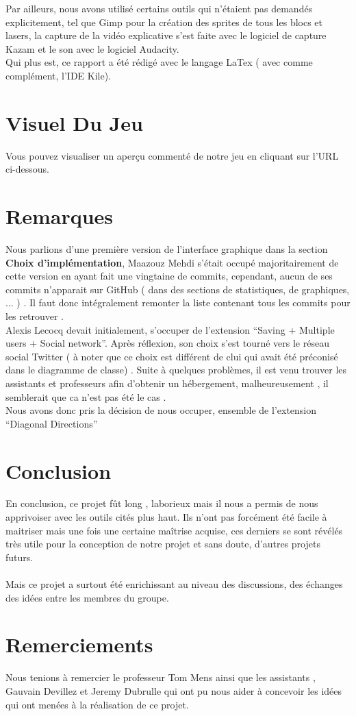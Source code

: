 \documentclass[a4paper,10pt]{article}
\begin{document}
Par ailleurs, nous avons utilisé certains outils qui n'étaient pas demandés explicitement, tel que Gimp pour la création des sprites de tous les blocs et lasers,
la capture de la vidéo explicative s'est faite avec le logiciel de capture Kazam et le son avec le logiciel Audacity.\\
Qui plus est, ce rapport a été rédigé avec le langage LaTex ( avec comme complément, l'IDE Kile).
\section{Visuel Du Jeu}
Vous pouvez visualiser un aperçu commenté de notre jeu en cliquant sur l'URL ci-dessous.
\\


\section{Remarques}
Nous parlions d'une première version de l'interface graphique dans la section \textbf{Choix d'implémentation}, Maazouz Mehdi s'était occupé majoritairement
de cette version en ayant fait une vingtaine de commits, cependant, aucun de ses commits n'apparait sur GitHub ( dans des sections de statistiques, 
de graphiques, ... ) . Il faut donc intégralement remonter la liste contenant tous les commits pour les retrouver .\\


Alexis Lecocq devait initialement, s'occuper de l'extension ``Saving + Multiple users + Social network''. Après réflexion, son choix
s'est tourné vers le réseau social Twitter ( à noter que ce choix est différent de clui qui avait été préconisé dans le diagramme de classe)
. Suite à quelques problèmes, il est venu trouver les assistants et professeurs afin d'obtenir un hébergement,
malheureusement , il semblerait que ca n'est pas été le cas .\\
Nous avons donc pris la décision de nous occuper, ensemble de l'extension ``Diagonal Directions''
\section{Conclusion}
En conclusion, ce projet fût long , laborieux mais il nous a permis de nous apprivoiser avec les outils cités plus haut. Ils n'ont pas
forcément été facile à maitriser mais une fois une certaine maîtrise acquise, ces derniers se sont révélés très utile pour la conception de 
notre projet et sans doute, d'autres projets futurs. 
\\
\\
Mais ce projet a surtout été enrichissant au niveau des discussions, des échanges des idées entre les membres du groupe.

\section{Remerciements}
Nous tenions à remercier le professeur Tom Mens ainsi que les assistants , Gauvain Devillez et Jeremy Dubrulle qui ont pu nous aider à concevoir les idées qui ont menées 
à la réalisation de ce projet.
\end{document}
